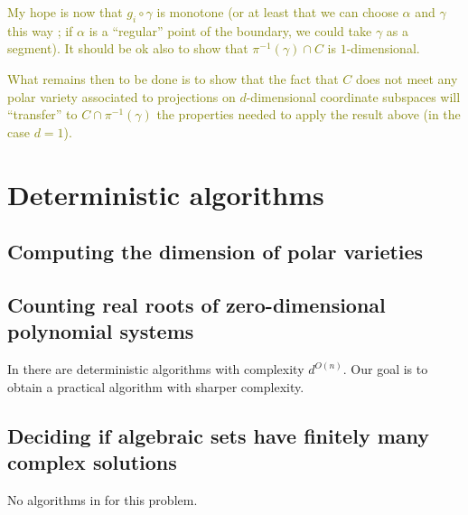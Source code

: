 \documentclass[10pt]{article}
\theoremstyle{definition}
\def\ms#1{\textcolor{olive}{#1}}
\begin{document}
\ms{My hope is now that $g_i\circ \gamma$ is monotone (or at least that we can
  choose $\alpha$ and $\gamma$ this way ; if $\alpha$ is a ``regular'' point of
  the boundary, we could take $\gamma$ as a segment). It should be ok also to
  show that $\pi^{-1}(\gamma)\cap C$ is $1$-dimensional. }

\ms{What remains then to be done is to show that the fact that $C$ does not meet
any polar variety associated to projections on $d$-dimensional coordinate
subspaces will ``transfer'' to $C\cap \pi^{-1}(\gamma)$ the properties needed to
apply the result above (in the case $d = 1$).}
%













\section{Deterministic algorithms}



\subsection{Computing the dimension of polar varieties}




\subsection{Counting real roots of zero-dimensional polynomial systems}
In \cite{BasuPollackRoy2006} there are deterministic algorithms with complexity $d^{O(n)}$. Our goal is to obtain a practical algorithm with sharper complexity. 



\subsection{Deciding if algebraic sets have finitely many complex solutions}
No algorithms in \cite{BasuPollackRoy2006} for this problem. 



\newpage 


\newpage 
\end{document}
